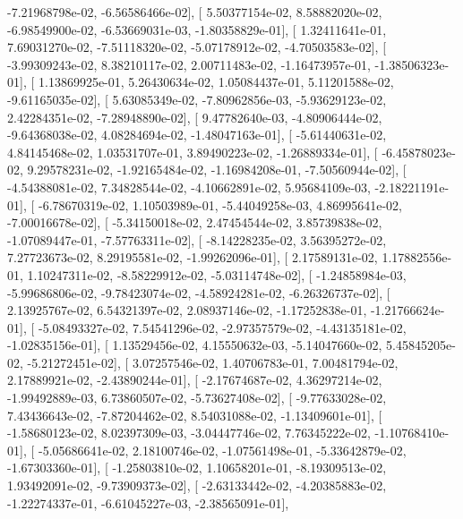 \documentclass{article}
\begin{document}
         -7.21968798e-02,  -6.56586466e-02],
       [  5.50377154e-02,   8.58882020e-02,  -6.98549900e-02,
         -6.53669031e-03,  -1.80358829e-01],
       [  1.32411641e-01,   7.69031270e-02,  -7.51118320e-02,
         -5.07178912e-02,  -4.70503583e-02],
       [ -3.99309243e-02,   8.38210117e-02,   2.00711483e-02,
         -1.16473957e-01,  -1.38506323e-01],
       [  1.13869925e-01,   5.26430634e-02,   1.05084437e-01,
          5.11201588e-02,  -9.61165035e-02],
       [  5.63085349e-02,  -7.80962856e-03,  -5.93629123e-02,
          2.42284351e-02,  -7.28948890e-02],
       [  9.47782640e-03,  -4.80906444e-02,  -9.64368038e-02,
          4.08284694e-02,  -1.48047163e-01],
       [ -5.61440631e-02,   4.84145468e-02,   1.03531707e-01,
          3.89490223e-02,  -1.26889334e-01],
       [ -6.45878023e-02,   9.29578231e-02,  -1.92165484e-02,
         -1.16984208e-01,  -7.50560944e-02],
       [ -4.54388081e-02,   7.34828544e-02,  -4.10662891e-02,
          5.95684109e-03,  -2.18221191e-01],
       [ -6.78670319e-02,   1.10503989e-01,  -5.44049258e-03,
          4.86995641e-02,  -7.00016678e-02],
       [ -5.34150018e-02,   2.47454544e-02,   3.85739838e-02,
         -1.07089447e-01,  -7.57763311e-02],
       [ -8.14228235e-02,   3.56395272e-02,   7.27723673e-02,
          8.29195581e-02,  -1.99262096e-01],
       [  2.17589131e-02,   1.17882556e-01,   1.10247311e-02,
         -8.58229912e-02,  -5.03114748e-02],
       [ -1.24858984e-03,  -5.99686806e-02,  -9.78423074e-02,
         -4.58924281e-02,  -6.26326737e-02],
       [  2.13925767e-02,   6.54321397e-02,   2.08937146e-02,
         -1.17252838e-01,  -1.21766624e-01],
       [ -5.08493327e-02,   7.54541296e-02,  -2.97357579e-02,
         -4.43135181e-02,  -1.02835156e-01],
       [  1.13529456e-02,   4.15550632e-03,  -5.14047660e-02,
          5.45845205e-02,  -5.21272451e-02],
       [  3.07257546e-02,   1.40706783e-01,   7.00481794e-02,
          2.17889921e-02,  -2.43890244e-01],
       [ -2.17674687e-02,   4.36297214e-02,  -1.99492889e-03,
          6.73860507e-02,  -5.73627408e-02],
       [ -9.77633028e-02,   7.43436643e-02,  -7.87204462e-02,
          8.54031088e-02,  -1.13409601e-01],
       [ -1.58680123e-02,   8.02397309e-03,  -3.04447746e-02,
          7.76345222e-02,  -1.10768410e-01],
       [ -5.05686641e-02,   2.18100746e-02,  -1.07561498e-01,
         -5.33642879e-02,  -1.67303360e-01],
       [ -1.25803810e-02,   1.10658201e-01,  -8.19309513e-02,
          1.93492091e-02,  -9.73909373e-02],
       [ -2.63133442e-02,  -4.20385883e-02,  -1.22274337e-01,
         -6.61045227e-03,  -2.38565091e-01],
\end{document}
